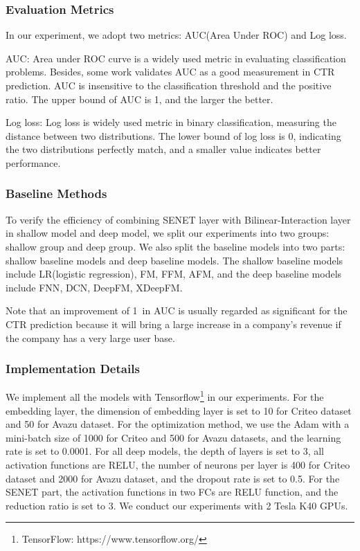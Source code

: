 \documentclass[sigconf]{acmart}
\begin{document}
\subsubsection{Evaluation Metrics}
In our experiment, we adopt two metrics: AUC(Area Under ROC) and Log
loss. 

AUC: Area under ROC curve is a widely used metric in evaluating
classification problems. Besides, some work validates AUC as a good
measurement in CTR prediction\cite{graepel2010web}. AUC is insensitive to the
classification threshold and the positive ratio. The upper bound of AUC
is 1, and the larger the better.

Log loss: Log loss is widely used metric in binary classification,
measuring the distance between two distributions. The lower bound of log
loss is 0, indicating the two distributions perfectly match, and a
smaller value indicates better performance.

\subsubsection{Baseline Methods}
To verify the efficiency of combining SENET layer with
Bilinear-Interaction layer in shallow model and deep model, we split our
experiments into two groups: shallow group and deep group. We also split
the baseline models into two parts: shallow baseline models and deep
baseline models. The shallow baseline models include LR(logistic
regression)\cite{mcmahan2013ad}, FM\cite{rendle2010factorization,rendle2012factorization}, FFM\cite{juan2016field,juan2017field}, AFM\cite{xiao2017attentional}, and the
deep baseline models include FNN\cite{zhang2016deep}, DCN\cite{wang2017deep}, DeepFM\cite{guo2017deepfm}, XDeepFM\cite{lian2018xdeepfm}.

Note that an improvement of 1\textperthousand\ in AUC is usually regarded as
significant for the CTR prediction because it will bring a large
increase in a company's revenue if the company has a very large user
base.

\subsubsection{Implementation Details}
\label{sec:414}
We implement all the models with Tensorflow\footnote{TensorFlow:
  https://www.tensorflow.org/} in our experiments. For the embedding
layer, the dimension of embedding layer is set to 10 for Criteo dataset
and 50 for Avazu dataset. For the optimization method, we use the
Adam\cite{kingma2014adam} with a mini-batch size of 1000 for Criteo and 500 for Avazu
datasets, and the learning rate is set to 0.0001. For all deep models, the depth of layers is set to 3, all activation functions are RELU, the number of neurons per layer
is 400 for Criteo dataset and 2000 for Avazu dataset, and the dropout
rate is set to 0.5. For the SENET part, the activation functions in two
FCs are RELU function, and the reduction ratio is set to 3. We conduct
our experiments with 2 Tesla K40 GPUs.
\end{document}
